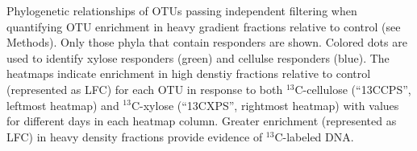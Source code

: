 Phylogenetic relationships of OTUs passing independent filtering when quantifying
OTU enrichment in heavy gradient fractions relative to control (see Methods). Only
those phyla that contain responders are shown. Colored dots are used to identify
xylose responders (green) and cellulse responders (blue). The heatmaps indicate
enrichment in high denstiy fractions relative to control (represented as LFC)
for each OTU in response to both $^{13}$C-cellulose (``13CCPS'', leftmost
heatmap) and $^{13}$C-xylose (``13CXPS'', rightmost heatmap) with values for
different days in each heatmap column. Greater enrichment (represented as LFC)
in heavy density fractions provide evidence of $^{13}$C-labeled DNA.

